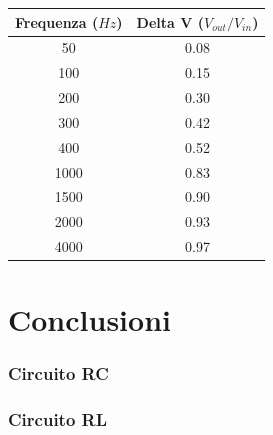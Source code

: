 \begin{center}
\begin{tabular}{*{2}{c}}
Frequenza ($Hz$) & Delta V ($V_{out}/V_{in}$) \\
\midrule
50 & 0.08 \\
100 & 0.15 \\
200 & 0.30 \\
300 & 0.42 \\
400 & 0.52 \\
1000 & 0.83 \\
1500 & 0.90 \\
2000 & 0.93 \\
4000 & 0.97 \\
\end{tabular}
\end{center}

\section{Conclusioni}
\subsubsection{Circuito RC}
\subsubsection{Circuito RL}
